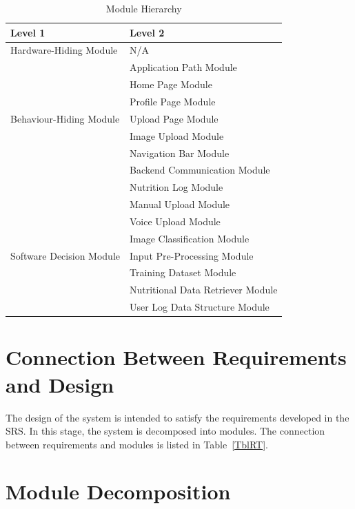 \documentclass[12pt, titlepage]{article}
\begin{document}
\begin{table}[h!]
\centering
\begin{tabular}{p{} p{}}
\toprule
\textbf{Level 1} & \textbf{Level 2}\\
\midrule

{Hardware-Hiding Module} & N/A \\
\midrule

\multirow{7}{0.3\textwidth}{Behaviour-Hiding Module} & Application Path Module\\
& Home Page Module\\
& Profile Page Module\\
& Upload Page Module\\
& Image Upload Module\\
& Navigation Bar Module\\
& Backend Communication Module\\ 
& Nutrition Log Module\\
& Manual Upload Module \\
& Voice Upload Module \\
\midrule

\multirow{3}{0.3\textwidth}{Software Decision Module} & Image Classification Module\\
& Input Pre-Processing Module\\
& Training Dataset Module\\
& Nutritional Data Retriever Module\\
& User Log Data Structure Module\\
\bottomrule

\end{tabular}
\caption{Module Hierarchy}
\label{TblMH}
\end{table}

\section{Connection Between Requirements and Design} \label{SecConnection}

The design of the system is intended to satisfy the requirements developed in
the SRS. In this stage, the system is decomposed into modules. The connection
between requirements and modules is listed in Table~\ref{TblRT}.

\section{Module Decomposition} \label{SecMD}
\end{document}
